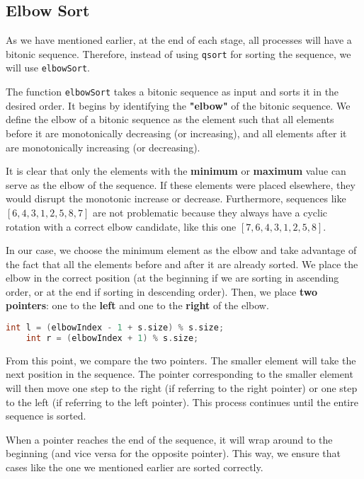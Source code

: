 \documentclass[12pt]{article}
\begin{document}
\subsection{Elbow Sort}
As we have mentioned earlier, at the end of each stage, all processes will have a bitonic sequence. Therefore, instead of using \texttt{qsort} for sorting the sequence, we will use \texttt{elbowSort}.

The function \texttt{elbowSort} takes a bitonic sequence as input and sorts it in the desired order. It begins by identifying the \textbf{"elbow"} of the bitonic sequence. We define the elbow of a bitonic sequence as the element such that all elements before it are monotonically decreasing (or increasing), and all elements after it are monotonically increasing (or decreasing). 

It is clear that only the elements with the \textbf{minimum} or \textbf{maximum} value can serve as the elbow of the sequence. If these elements were placed elsewhere, they would disrupt the monotonic increase or decrease. Furthermore, sequences like \([6, 4, 3, 1, 2, 5, 8, 7]\) are not problematic because they always have a cyclic rotation with a correct elbow candidate, like this one \([7, 6, 4, 3, 1, 2, 5, 8]\).

In our case, we choose the minimum element as the elbow and take advantage of the fact that all the elements before and after it are already sorted. We place the elbow in the correct position (at the beginning if we are sorting in ascending order, or at the end if sorting in descending order). Then, we place \textbf{two pointers}: one to the \textbf{left} and one to the \textbf{right} of the elbow.
\vspace{0.3cm}
\begin{lstlisting}[language=C]
    int l = (elbowIndex - 1 + s.size) % s.size;
    int r = (elbowIndex + 1) % s.size;
\end{lstlisting}
\vspace{0.3cm}
From this point, we compare the two pointers. The smaller element will take the next position in the sequence. The pointer corresponding to the smaller element will then move one step to the right (if referring to the right pointer) or one step to the left (if referring to the left pointer). This process continues until the entire sequence is sorted.

When a pointer reaches the end of the sequence, it will wrap around to the beginning (and vice versa for the opposite pointer). This way, we ensure that cases like the one we mentioned earlier are sorted correctly.
\newpage
\end{document}

